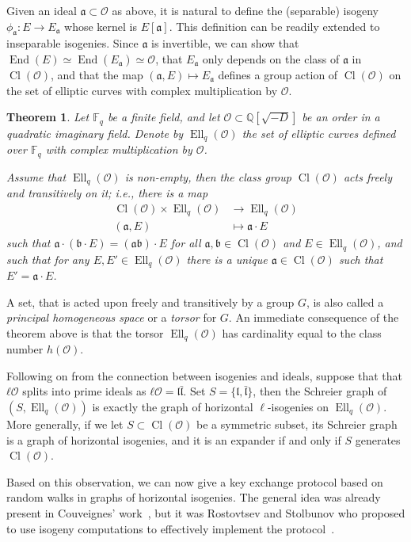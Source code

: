 \documentclass[10pt]{article}
\theoremstyle{plain}
\newtheorem{theorem}{Theorem}
\theoremstyle{definition}
\DeclareMathOperator{\End}{End} %
\DeclareMathOperator{\Cl}{Cl}
\DeclareMathOperator{\Ell}{Ell}
\def\F{\ensuremath{\mathbb{F}}}
\def\O{\ensuremath{\mathcal{O}}}
\def\a{\ensuremath{\mathfrak{a}}}
\begin{document}
Given an ideal $\a⊂\O$ as above, it is natural to define the
(separable) isogeny $ϕ_{\a}:E\to E_{\a}$ whose kernel is $E[\a]$. %
This definition can be readily extended to inseparable isogenies. %
Since $\a$ is invertible, we can show that $\End(E)≃\End(E_\a)≃\O$,
that $E_\a$ only depends on the class of $\a$ in $\Cl(\O)$, and that
the map $(\a,E)\mapsto E_\a$ defines a group action of $\Cl(\O)$ on
the set of elliptic curves with complex multiplication by $\O$.

\begin{theorem}
  Let $\F_q$ be a finite field, and let $\O⊂ℚ[\sqrt{-D}]$ be an order
  in a quadratic imaginary field. %
  Denote by $\Ell_q(\O)$ the set of elliptic curves defined over
  $\F_q$ with complex multiplication by $\O$.

  Assume that $\Ell_q(\O)$ is non-empty, then the class group
  $\Cl(\O)$ acts \emph{freely} and \emph{transitively} on it; i.e.,
  there is a map
  \begin{align*}
    \Cl(\O)×\Ell_q(\O) &\to \Ell_q(\O)\\
    (\a,E) &\mapsto \a·E
  \end{align*}
  such that $\a·(\mathfrak{b}·E)=(\a\mathfrak{b})·E$ for all
  $\a,\mathfrak{b}∈\Cl(\O)$ and $E∈\Ell_q(\O)$, and such that for any
  $E,E'∈\Ell_q(\O)$ there is a unique $\a∈\Cl(\O)$ such that
  $E'=\a·E$. %
\end{theorem}

A set, that is acted upon freely and transitively by a group $G$, is
also called a \emph{principal homogeneous space} or a \emph{torsor}
for $G$. %
An immediate consequence of the theorem above is that the torsor
$\Ell_q(\O)$ has cardinality equal to the class number $h(\O)$. %

Following on from the connection between isogenies and ideals, suppose
that that $ℓ\O$ splits into prime ideals as
$ℓ\O=\mathfrak{l}\bar{\mathfrak{l}}$. %
Set $S=\{\mathfrak{l},\bar{\mathfrak{l}}\}$, then the Schreier graph
of $(S, \Ell_q(\O))$ is exactly the graph of horizontal
$\ell$-isogenies on $\Ell_q(\O)$. %
More generally, if we let $S⊂\Cl(\O)$ be a symmetric subset, its
Schreier graph is a graph of horizontal isogenies, and it is an
expander if and only if $S$ generates $\Cl(\O)$.

Based on this observation, we can now give a key exchange protocol
based on random walks in graphs of horizontal isogenies. %
The general idea was already present in Couveignes' work~\cite{Couv},
but it was Rostovtsev and Stolbunov who proposed to use isogeny
computations to effectively implement the protocol~\cite{R&S,Stol}. %
\end{document}
